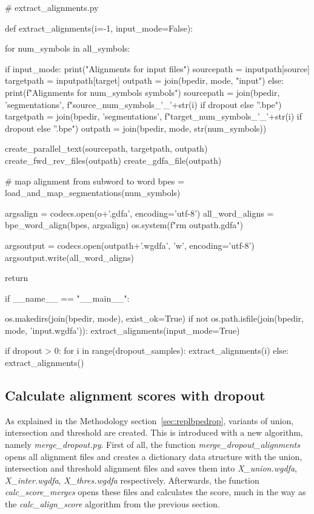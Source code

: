 \begin{python}
# extract_alignments.py

def extract_alignments(i=-1, input_mode=False):

  for num_symbols in all_symbols:

    if input_mode:
      print("Alignments for input files")
      sourcepath = inputpath[source]
      targetpath = inputpath[target]
      outpath = join(bpedir, mode, "input")
    else:
      print(f"Alignments for {num_symbols} symbols")
      sourcepath = join(bpedir, 'segmentations', f"{source}_{num_symbols}_{'_'+str(i) if dropout else ''}.bpe")
      targetpath = join(bpedir, 'segmentations', f"{target}_{num_symbols}_{'_'+str(i) if dropout else ''}.bpe")
      outpath = join(bpedir, mode, str(num_symbols))

    create_parallel_text(sourcepath, targetpath, outpath)
    create_fwd_rev_files(outpath)
    create_gdfa_file(outpath)

    # map alignment from subword to word
    bpes = load_and_map_segmentations(num_symbols)

    argsalign = codecs.open(o+'.gdfa', encoding='utf-8')
    all_word_aligns = bpe_word_align(bpes, argsalign)
    os.system(f"rm {outpath}.gdfa")

    argsoutput = codecs.open(outpath+'.wgdfa', 'w', encoding='utf-8')
    argsoutput.write(all_word_aligns)

  return

if __name__ == "__main__":

  os.makedirs(join(bpedir, mode), exist_ok=True)
  if not os.path.isfile(join(bpedir, mode, 'input.wgdfa')):
    extract_alignments(input_mode=True)

  if dropout > 0:
    for i in range(dropout_samples):
      extract_alignments(i)
  else:
    extract_alignments()
\end{python}

\subsection{Calculate alignment scores with dropout}

As explained in the Methodology section~\ref{sec:replbpedrop}, variants of union, intersection and threshold are created. This is introduced with a new algorithm, namely \emph{merge\_dropout.py}. First of all, the function \emph{merge\_dropout\_alignments} opens all alignment files and creates a dictionary data structure with the union, intersection and threshold alignment files and saves them into \emph{X\_union.wgdfa}, \emph{X\_inter.wgdfa}, \emph{X\_thres.wgdfa} respectively. Afterwards, the function \emph{calc\_score\_merges} opens these files and calculates the score, much in the way as the \emph{calc\_align\_score} algorithm from the previous section.


